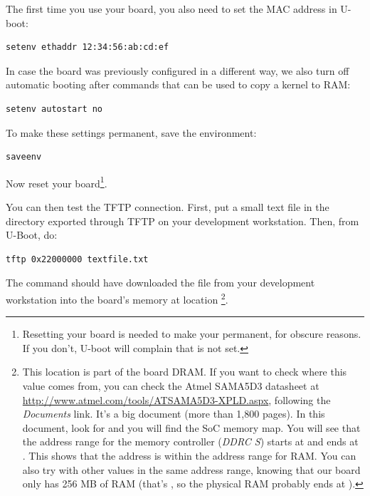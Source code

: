 The first time you use your board, you also need to set the MAC
address in U-boot:

\begin{verbatim}
setenv ethaddr 12:34:56:ab:cd:ef
\end{verbatim}

In case the board was previously configured in a different way, we
also turn off automatic booting after commands that can be used to
copy a kernel to RAM:

\begin{verbatim}
setenv autostart no
\end{verbatim}

To make these settings permanent, save the environment:

\begin{verbatim}
saveenv
\end{verbatim}

Now reset your board\footnote{Resetting your board is needed to
make your  permanent, for obscure reasons. If you
don't, U-boot will complain that  is not
set.}.

You can then test the TFTP connection. First, put a small text file in
the directory exported through TFTP on your development
workstation. Then, from U-Boot, do:

\begin{verbatim}
tftp 0x22000000 textfile.txt
\end{verbatim}



The  command should have downloaded the
 file from your development workstation into
the board's memory at location \footnote{
This location is part of the board DRAM. If you want
to check where this value comes from, you can check the Atmel SAMA5D3
datasheet at \url{http://www.atmel.com/tools/ATSAMA5D3-XPLD.aspx}, 
following the {\em Documents} link. It's a big document (more than 1,800
pages). In this document, look for  and you
will find the SoC memory map. You will see that the address range for
the memory controller ({\em DDRC S}) starts at 
and ends at . This shows that the  
address is within the address range for RAM. You can also try with other
values in the same address range, knowing that our board only has 256 MB
of RAM (that's , so the physical RAM probably ends at
).}.

